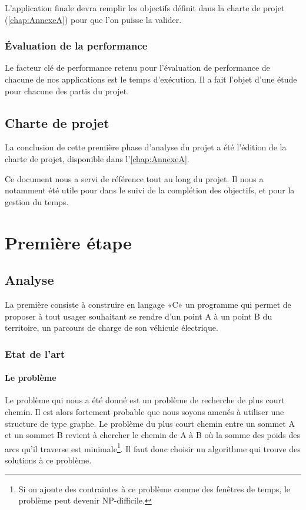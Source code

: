 \documentclass[a4paper, 12pt]{report}
\begin{document}
L'application finale devra remplir les objectifs définit dans la charte de projet (\autoref{chap:AnnexeA}) pour que l'on puisse la valider.

\subsection{Évaluation de la performance}
Le facteur clé de performance retenu pour l'évaluation de performance de chacune de nos applications est le temps d'exécution. Il a fait l'objet d'une étude pour chacune des partis du projet.

\clearpage

\section{Charte de projet}
La conclusion de cette première phase d'analyse du projet a été l'édition de la charte de projet, disponible dans l'\autoref{chap:AnnexeA}.
\bigskip

Ce document nous a servi de référence tout au long du projet. Il nous a notamment été utile pour dans le suivi de la complétion des objectifs, et pour la gestion du temps.
\chapter{Première étape}
\minitoc
{}
\clearpage
\section{Analyse}

La première consiste à construire en langage «C» un programme qui permet de proposer à tout usager souhaitant se rendre d'un point A à un point B du territoire, un parcours de charge de son véhicule électrique.

\subsection{Etat de l'art}
\subsubsection{Le problème}
Le problème qui nous a été donné est un problème de recherche de plus court chemin. Il est alors fortement probable que nous soyons amenés à utiliser une structure de type graphe. Le problème du plus court chemin entre un sommet A et un sommet B revient à chercher le chemin de A à B où la somme des poids des arcs qu’il traverse est minimale\footnote{Si on ajoute des contraintes à ce problème comme des fenêtres de temps, le problème peut devenir NP-difficile.}. Il faut donc choisir un algorithme qui trouve des solutions à ce problème.
\end{document}
